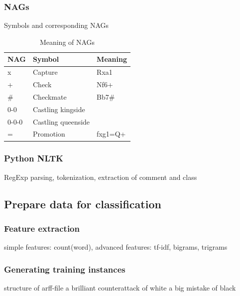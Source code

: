 \documentclass[article,type=msc,colorback,accentcolor=tud7b]{tudthesis}
\begin{document}
  \subsubsection{NAGs}
	Symbols and corresponding NAGs
	
	\begin{table}[H]
      \begin{tabular}{| l | l | l |}
    	\hline
    	NAG & Symbol & Meaning \\ \hline
    	x & Capture & Rxa1 \\ \hline
    	+ & Check & Nf6+ \\ \hline
    	\# & Checkmate & Bb7\# \\ \hline
    	0-0 & Castling kingside & \\ \hline
    	0-0-0 & Castling queenside & \\ \hline
    	= & Promotion & fxg1=Q+ \\ \hline
      \end{tabular}
      \caption{Meaning of NAGs}
      \label{tab:meaning_of_nags}
	\end{table}

  \subsubsection{Python NLTK}
	RegExp parsing, tokenization, extraction of comment and class  
  
  \subsection{Prepare data for classification}

  \subsubsection{Feature extraction}
    simple features: count(word), advanced features: tf-idf, bigrams, trigrams

  \subsubsection{Generating training instances}
    structure of arff-file
	a brilliant counterattack of white
	a big mistake of black	   
    
\end{document}
